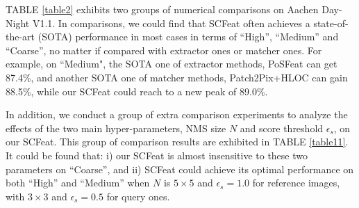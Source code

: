 \documentclass[journal]{IEEEtran}
\begin{document}
TABLE \ref{table2} exhibits two groups of numerical comparisons on Aachen Day-Night V1.1.
In comparisons, we could find that SCFeat often achieves a state-of-the-art (SOTA) performance in most cases in terms of ``High'', ``Medium'' and ``Coarse'', no matter if compared with extractor ones or matcher ones. For example, on ``Medium", the SOTA one of extractor methods, PoSFeat can get 87.4\%, and another SOTA one of matcher methods, Patch2Pix+HLOC can gain 88.5\%, while our SCFeat could reach to a new peak of 89.0\%.



\begin{table}[h]
\centering
\caption{Impact of Hyper-parameters: the evaluation comparisons on Aachen Day-Night v1.1 for visual localization, with maximal interest point number $20k$. ``High", ``Medium" and ``Coarse" present $(0.25m, 2^{\circ})$, $(0.5m, 5^{\circ})$, and $(5m, 10^{\circ})$, respectively. 
}
\renewcommand\arraystretch{1.2}
\label{table11}
\end{table}

In addition, we conduct a group of extra comparison experiments to analyze the effects of the two main hyper-parameters, NMS size $N$ and score threshold $\epsilon_s$, on our SCFeat.
This group of comparison results are exhibited in TABLE \ref{table11}. It could be found that: i) our SCFeat is almost insensitive to these two parameters on ``Coarse'', and ii) SCFeat could achieve its optimal performance on both ``High'' and ``Medium'' when $N$ is $5\times5$ and $\epsilon_s=1.0$ for reference images, with $3\times3$ and $\epsilon_s=0.5$ for query ones. 
\end{document}
